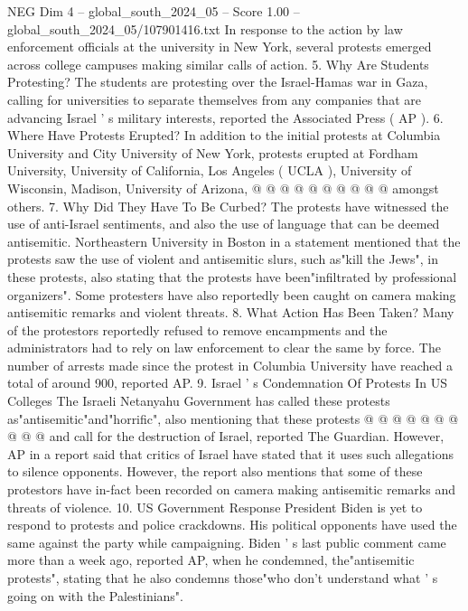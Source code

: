 \begin{textsample}{NEG Dim 4 – global\_south\_2024\_05 – Score 1.00 – global\_south\_2024\_05/107901416.txt}
In response to the action by law enforcement officials at the university in New York, several protests emerged across college campuses making similar calls of action. 5.
Why Are Students Protesting?
The students are protesting over the Israel-Hamas war in Gaza, calling for universities to separate themselves from any companies that are advancing Israel ' s military interests, reported the Associated Press ( AP ). 6.
Where Have Protests Erupted?
In addition to the initial protests at Columbia University and City University of New York, protests erupted at Fordham University, University of California, Los Angeles ( UCLA ), University of Wisconsin, Madison, University of Arizona, @ @ @ @ @ @ @ @ @ @ amongst others. 7.
Why Did They Have To Be Curbed?
The protests have witnessed the use of anti-Israel sentiments, and also the use of language that can be deemed antisemitic.
Northeastern University in Boston in a statement mentioned that the protests saw the use of violent and antisemitic slurs, such as"kill the Jews", in these protests, also stating that the protests have been"infiltrated by professional organizers".
Some protesters have also reportedly been caught on camera making antisemitic remarks and violent threats. 8.
What Action Has Been Taken?
Many of the protestors reportedly refused to remove encampments and the administrators had to rely on law enforcement to clear the same by force.
The number of arrests made since the protest in Columbia University have reached a total of around 900, reported AP. 9.
Israel ' s Condemnation Of Protests In US Colleges The Israeli Netanyahu Government has called these protests as"antisemitic"and"horrific", also mentioning that these protests @ @ @ @ @ @ @ @ @ @ and call for the destruction of Israel, reported The Guardian.
However, AP in a report said that critics of Israel have stated that it uses such allegations to silence opponents.
However, the report also mentions that some of these protestors have in-fact been recorded on camera making antisemitic remarks and threats of violence. 10.
US Government Response President Biden is yet to respond to protests and police crackdowns.
His political opponents have used the same against the party while campaigning.
Biden ' s last public comment came more than a week ago, reported AP, when he condemned, the"antisemitic protests", stating that he also condemns those"who don't understand what ' s going on with the Palestinians".

\end{textsample}
